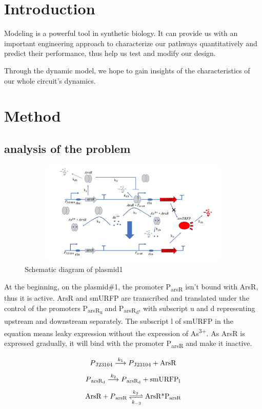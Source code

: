 \section{Introduction}
Modeling is a powerful tool in synthetic biology. It can provide us with an important engineering approach to characterize our pathways quantitatively and predict their performance, thus help us test and modify our design.

Through the dynamic model, we hope to gain insights of the characteristics of our whole circuit's dynamics.

\section{Method}
\subsection{analysis of the problem}
\begin{figure}[h]
\centering
\includegraphics[width=12cm,height=5cm]{1}
\caption{Schematic diagram of plasmid1}
\end{figure}

At the beginning, on the plasmid\#1, the promoter P\textsubscript{arsR} isn't bound with ArsR, thus it is active. ArsR and smURFP are transcribed and translated under the control of the promoters P\textsubscript{arsR\textsubscript{u}} and P\textsubscript{arsR\textsubscript{d}}, with subscript u and d representing upstream and downstream separately. The subscript l of smURFP in the equation means leaky expression without the expression of As\textsuperscript{3+}. As ArsR is expressed gradually, it will bind with the promoter P\textsubscript{arsR} and make it inactive. \cite{pola2018novel}

\begin{equation}
P\textsubscript{J23104}\stackrel{k_1}{\longrightarrow} P\textsubscript{J23104}+\text{ArsR}
\end{equation}
\begin{equation}
P\textsubscript{arsR\textsubscript{d}} \stackrel{k_2}{\longrightarrow} P\textsubscript{arsR\textsubscript{d}} +\text{smURFP\textsubscript{l}}
\end{equation}
\begin{equation}
\text{ArsR}+P\textsubscript{arsR} \xrightleftharpoons[k_{-3}]{k_3}\text{ArsR*P\textsubscript{arsR}}
\end{equation} 

